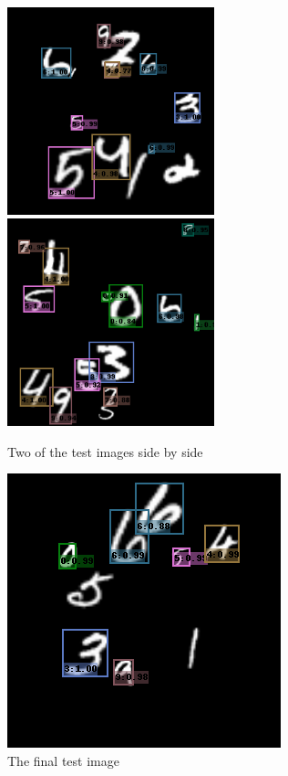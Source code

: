 \documentclass{article}
\begin{document}
\begin{figure}[H]%
    \centering
    {{\includegraphics[width=6cm]{Assignments/Assignment_4/plots/12.png} }}%
    \qquad
    {{\includegraphics[width=6cm]{Assignments/Assignment_4/plots/13.png} }}%
    \caption{Two of the test images side by side}%
    \label{fig:test6}%
\end{figure}


\begin{figure}[H]
    \centering
    \includegraphics[width=\textwidth]{Assignments/Assignment_4/plots/14.png}
    \caption{The final test image}
    \label{fig:test7}
\end{figure}
\end{document}
